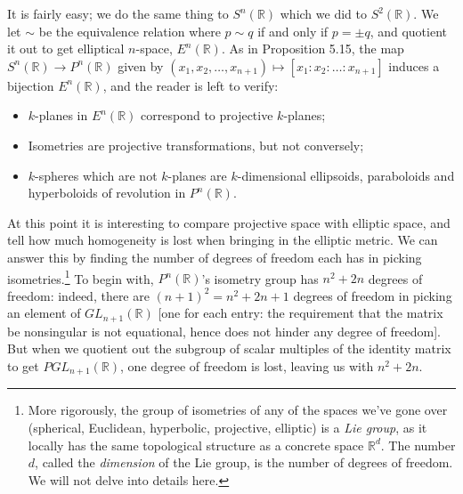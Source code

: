 \documentclass[leqno]{book}
\begin{document}
It is fairly easy; we do the same thing to $S^n(\mathbb R)$ which we did to $S^2(\mathbb R)$.  We let $\sim$ be the equivalence relation where $p\sim q$ if and only if $p=\pm q$, and quotient it out to get elliptical $n$-space, $E^n(\mathbb R)$.  As in Proposition 5.15, the map $S^n(\mathbb R)\to P^n(\mathbb R)$ given by $(x_1,x_2,\dots,x_{n+1})\mapsto[x_1:x_2:\dots:x_{n+1}]$ induces a bijection $E^n(\mathbb R)$, and the reader is left to verify:
\begin{itemize}
\item $k$-planes in $E^n(\mathbb R)$ correspond to projective $k$-planes;

\item Isometries are projective transformations, but not conversely;

\item $k$-spheres which are not $k$-planes are $k$-dimensional ellipsoids, paraboloids and hyperboloids of revolution in $P^n(\mathbb R)$.\\
\end{itemize}
\noindent At this point it is interesting to compare projective space with elliptic space, and tell how much homogeneity is lost when bringing in the elliptic metric.  We can answer this by finding the number of degrees of freedom each has in picking isometries.\footnote{More rigorously, the group of isometries of any of the spaces we've gone over (spherical, Euclidean, hyperbolic, projective, elliptic) is a \emph{Lie group}, as it locally has the same topological structure as a concrete space $\mathbb R^d$.  The number $d$, called the \emph{dimension} of the Lie group, is the number of degrees of freedom.  We will not delve into details here.}  To begin with, $P^n(\mathbb R)$'s isometry group has $n^2+2n$ degrees of freedom: indeed, there are $(n+1)^2=n^2+2n+1$ degrees of freedom in picking an element of $GL_{n+1}(\mathbb R)$ [one for each entry: the requirement that the matrix be nonsingular is not equational, hence does not hinder any degree of freedom].  But when we quotient out the subgroup of scalar multiples of the identity matrix to get $PGL_{n+1}(\mathbb R)$, one degree of freedom is lost, leaving us with $n^2+2n$.
\end{document}
